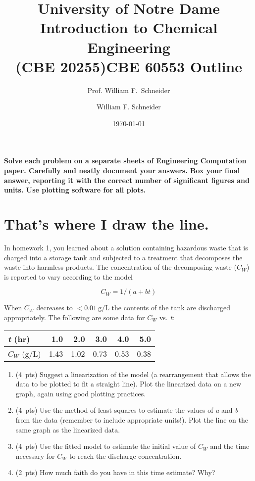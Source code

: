 \documentclass[11pt]{article}
\title{University of Notre Dame\\Introduction to Chemical Engineering\\(CBE 20255)}
\author{Prof. William F.\ Schneider}
\author{William F. Schneider}
\date{\today}
\title{CBE 60553 Outline}
\begin{document}
\begin{options}
\end{options}

\noindent \textbf{Solve each problem on a separate sheets of Engineering Computation paper.  Carefully and neatly document your answers. Box your final answer, reporting it with the correct number of significant figures and units.  Use plotting software for all plots.}


\section{That's where I draw the line.}
\label{sec-1}
In homework 1, you learned about a solution containing hazardous waste that is charged into a storage tank and subjected to a treatment that decomposes the waste into harmless products.  The concentration of the decomposing waste (\(C_{W}\)) is reported to vary according to the model

\[ C_{W} = 1/(a + bt) \]

\noindent When \(C_{W}\) decreases to \(< \SI{0.01}{\g\per\L}\) the contents of the tank are discharged appropriately.  The following are some data for \(C_{W}\) vs. \emph{t}:

\begin{center}
\begin{tabular}{lrrrrr}
\emph{t} (hr) & 1.0 & 2.0 & 3.0 & 4.0 & 5.0\\
\hline
\(C_{W}\) (g/L) & 1.43 & 1.02 & 0.73 & 0.53 & 0.38\\
\end{tabular}
\end{center}

\begin{enumerate}
\item (4~pts) Suggest a linearization of the model (a rearrangement that allows the data to
be plotted to fit a straight line).  Plot the linearized data on a new graph,
again using good plotting practices.
\item (4~pts) Use the method of least squares to estimate the values of \emph{a}
and \emph{b} from the data (remember to include appropriate units!).  Plot the
line on the same graph as the linearized data.
\item (4~pts) Use the fitted model to estimate the initial value of \(C_{W}\)
   and the time necessary for \(C_{W}\) to reach the discharge concentration.
\item (2~pts) How much faith do you have in this time estimate?  Why?
\end{enumerate}
\end{document}
